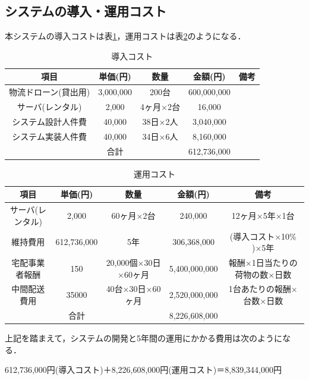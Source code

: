 \documentclass[a4paper, titlepage]{jsarticle}
\begin{document}
\subsection{システムの導入・運用コスト}
本システムの導入コストは表\ref{tab:label1}，運用コストは表\ref{tab:label2}のようになる．
\begin{table}[H]
  \centering
  \caption{導入コスト}
  \begin{tabular}{c c c c c}
    \hline
    項目          & 単価(円)     & 数量     & 金額(円)       & 備考 \\
    \hline \hline
    物流ドローン(貸出用) & 3,000,000 & 200台   & 600,000,000 &    \\
    サーバ(レンタル)   & 2,000     & 4ヶ月×2台 & 16,000      &    \\
    システム設計人件費   & 40,000    & 38日×2人 & 3,040,000   &    \\
    システム実装人件費   & 40,000    & 34日×6人 & 8,160,000   &    \\
    \hline \hline
                & 合計        &        & 612,736,000 &    \\
    \hline
  \end{tabular}
  \label{tab:label1}
\end{table}

\begin{table}[H]
  \centering
  \caption{運用コスト}
  \begin{tabular}{c c c c c}
    \hline
    項目        & 単価(円)       & 数量               & 金額(円)         & 備考               \\
    \hline \hline
    サーバ(レンタル) & 2,000       & 60ヶ月×2台          & 240,000       & 12ヶ月×5年×1台       \\
    維持費用      & 612,736,000 & 5年               & 306,368,000   & (導入コスト×10\% )×5年 \\
    宅配事業者報酬   & 150         & 20,000個×30日×60ヶ月 & 5,400,000,000 & 報酬×1日当たりの荷物の数×日数 \\
    中間配送費用    & 35000       & 40台×30日×60ヶ月     & 2,520,000,000 & 1台あたりの報酬×台数×日数   \\
    \hline \hline
              & 合計          &                  & 8,226,608,000 &                  \\
    \hline
  \end{tabular}
  \label{tab:label2}
\end{table}

上記を踏まえて，システムの開発と5年間の運用にかかる費用は次のようになる．
\begin{center}
  612,736,000円(導入コスト)＋8,226,608,000円(運用コスト)＝8,839,344,000円
\end{center}
\end{document}
